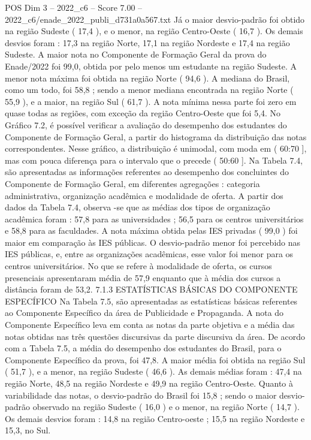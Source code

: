 \begin{textsample}{POS Dim 3 – 2022\_c6 – Score 7.00 – 2022\_c6/enade\_2022\_publi\_d731a0a567.txt}
Já o maior desvio-padrão foi obtido na região Sudeste ( 17,4 ), e o menor, na região Centro-Oeste ( 16,7 ).
Os demais desvios foram : 17,3 na região Norte, 17,1 na região Nordeste e 17,4 na região Sudeste.
A maior nota no Componente de Formação Geral da prova do Enade/2022 foi 99,0, obtida por pelo menos um estudante na região Sudeste.
A menor nota máxima foi obtida na região Norte ( 94,6 ).
A mediana do Brasil, como um todo, foi 58,8 ; sendo a menor mediana encontrada na região Norte ( 55,9 ), e a maior, na região Sul ( 61,7 ).
A nota mínima nessa parte foi zero em quase todas as regiões, com exceção da região Centro-Oeste que foi 5,4.
No Gráfico 7.2, é possível verificar a avaliação do desempenho dos estudantes do Componente de Formação Geral, a partir do histograma da distribuição das notas correspondentes.
Nesse gráfico, a distribuição é unimodal, com moda em ( 60:70 ], mas com pouca diferença para o intervalo que o precede ( 50:60 ].
Na Tabela 7.4, são apresentadas as informações referentes ao desempenho dos concluintes do Componente de Formação Geral, em diferentes agregações : categoria administrativa, organização acadêmica e modalidade de oferta.
A partir dos dados da Tabela 7.4, observa -se que as médias dos tipos de organização acadêmica foram : 57,8 para as universidades ; 56,5 para os centros universitários e 58,8 para as faculdades.
A nota máxima obtida pelas IES privadas ( 99,0 ) foi maior em comparação às IES públicas.
O desvio-padrão menor foi percebido nas IES públicas, e, entre as organizações acadêmicas, esse valor foi menor para os centros universitários.
No que se refere à modalidade de oferta, os cursos presenciais apresentaram média de 57,9 enquanto que à média dos cursos a distância foram de 53,2. 7.1.3 ESTATÍSTICAS BÁSICAS DO COMPONENTE ESPECÍFICO Na Tabela 7.5, são apresentadas as estatísticas básicas referentes ao Componente Específico da área de Publicidade e Propaganda.
A nota do Componente Específico leva em conta as notas da parte objetiva e a média das notas obtidas nas três questões discursivas da parte discursiva da área.
De acordo com a Tabela 7.5, a média do desempenho dos estudantes do Brasil, para o Componente Específico da prova, foi 47,8.
A maior média foi obtida na região Sul ( 51,7 ), e a menor, na região Sudeste ( 46,6 ).
As demais médias foram : 47,4 na região Norte, 48,5 na região Nordeste e 49,9 na região Centro-Oeste.
Quanto à variabilidade das notas, o desvio-padrão do Brasil foi 15,8 ; sendo o maior desvio-padrão observado na região Sudeste ( 16,0 ) e o menor, na região Norte ( 14,7 ).
Os demais desvios foram : 14,8 na região Centro-oeste ; 15,5 na região Nordeste e 15,3, no Sul.

\end{textsample}
